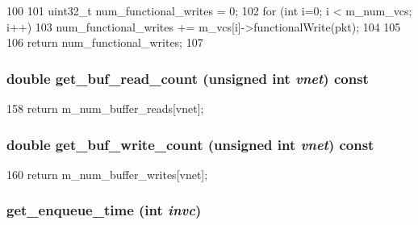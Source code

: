 \begin{DoxyCode}
100 {
101     uint32_t num_functional_writes = 0;
102     for (int i=0; i < m_num_vcs; i++) {
103         num_functional_writes += m_vcs[i]->functionalWrite(pkt);
104     }
105 
106     return num_functional_writes;
107 }
\end{DoxyCode}
\hypertarget{classInputUnit__d_a01aa7a2e66e9ffe94fa3edb16578424d}{
\subsubsection[{get\_\-buf\_\-read\_\-count}]{\setlength{\rightskip}{0pt plus 5cm}double get\_\-buf\_\-read\_\-count (unsigned int {\em vnet}) const}}
\label{classInputUnit__d_a01aa7a2e66e9ffe94fa3edb16578424d}



\begin{DoxyCode}
158     { return m_num_buffer_reads[vnet]; }
\end{DoxyCode}
\hypertarget{classInputUnit__d_afd026850992292ca2b7efc6786fe5cc8}{
\subsubsection[{get\_\-buf\_\-write\_\-count}]{\setlength{\rightskip}{0pt plus 5cm}double get\_\-buf\_\-write\_\-count (unsigned int {\em vnet}) const}}
\label{classInputUnit__d_afd026850992292ca2b7efc6786fe5cc8}



\begin{DoxyCode}
160     { return m_num_buffer_writes[vnet]; }
\end{DoxyCode}
\hypertarget{classInputUnit__d_a7798871f894ba591ca7f4aa75ee14791}{
\subsubsection[{get\_\-enqueue\_\-time}]{ get\_\-enqueue\_\-time (int {\em invc})}}
\label{classInputUnit__d_a7798871f894ba591ca7f4aa75ee14791}



